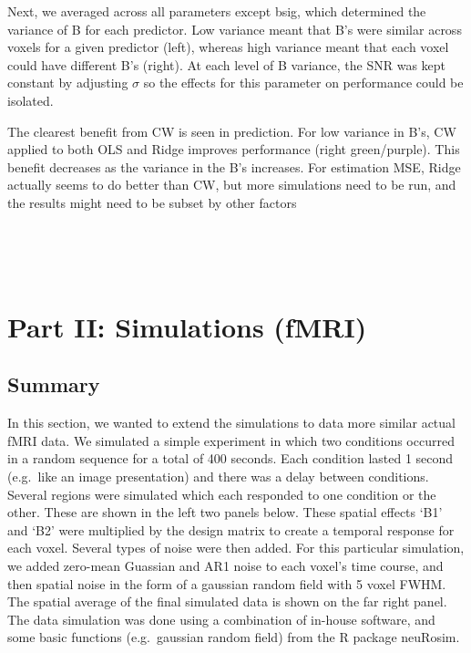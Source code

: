 \documentclass{article}
\begin{document}
Next, we averaged across all parameters except bsig, which determined
the variance of B for each predictor. Low variance meant that B's were
similar across voxels for a given predictor (left), whereas high
variance meant that each voxel could have different B's (right). At each
level of B variance, the SNR was kept constant by adjusting $ \sigma $
so the effects for this parameter on performance could be isolated.

The clearest benefit from CW is seen in prediction. For low variance in
B's, CW applied to both OLS and Ridge improves performance (right
green/purple). This benefit decreases as the variance in the B's
increases. For estimation MSE, Ridge actually seems to do better than
CW, but more simulations need to be run, and the results might need to
be subset by other factors


    \begin{center}
    \end{center}
    { \hspace*{\fill} \\}
    

    \begin{center}
    \end{center}
    { \hspace*{\fill} \\}
    
    \section{Part II: Simulations (fMRI)}\label{part-ii-simulations-fmri}

\subsection{Summary}

In this section, we wanted to extend the simulations to data more
similar actual fMRI data. We simulated a simple experiment in which two
conditions occurred in a random sequence for a total of 400 seconds.
Each condition lasted 1 second (e.g.~like an image presentation) and
there was a delay between conditions. Several regions were simulated
which each responded to one condition or the other. These are shown in
the left two panels below. These spatial effects `B1' and `B2' were
multiplied by the design matrix to create a temporal response for each
voxel. Several types of noise were then added. For this particular
simulation, we added zero-mean Guassian and AR1 noise to each voxel's
time course, and then spatial noise in the form of a gaussian random
field with 5 voxel FWHM. The spatial average of the final simulated data
is shown on the far right panel. The data simulation was done using a
combination of in-house software, and some basic functions
(e.g.~gaussian random field) from the R package neuRosim.
\end{document}
